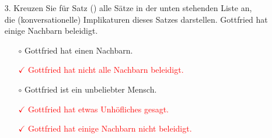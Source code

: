 {\begin{frame}
\begin{enumerate}
\end{enumerate}

\end{frame}


\begin{frame}

\begin{enumerate}
\item[3.] Kreuzen Sie für Satz () alle Sätze in der unten stehenden Liste an,\\
          die (konversationelle) Implikaturen dieses Satzes darstellen.
\ea
Gottfried hat einige Nachbarn beleidigt.
\z 
\begin{itemize}
\item[$\circ$] Gottfried hat einen Nachbarn.
\item[\textcolor{red}{$\checkmark$}] \textcolor{red}{Gottfried hat nicht alle Nachbarn beleidigt.}
\item[$\circ$] Gottfried ist ein unbeliebter Mensch.
\item[\textcolor{red}{$\checkmark$}] \textcolor{red}{Gottfried hat etwas Unhöfliches gesagt.}
\item[\textcolor{red}{$\checkmark$}] \textcolor{red}{Gottfried hat einige Nachbarn nicht beleidigt.}
\end{itemize}

\end{enumerate}

\end{frame}

}



\nocite{Levinson1983}






